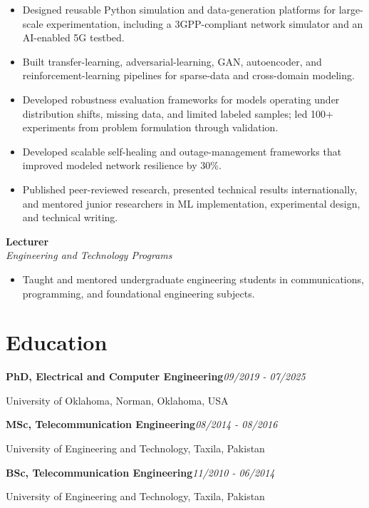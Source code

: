 \documentclass[9pt,letterpaper]{extarticle}
\newcommand{\role}[4]{%
  \Needspace{4\baselineskip}\textbf{#1}\hfill\textbf{#2}\\[-1pt]
  \textit{#3}\hfill\textit{#4}\par}
\newcommand{\entry}[2]{\Needspace{4\baselineskip}\textbf{#1}\hfill\textit{#2}\par}
\begin{document}
\begin{itemize}
\item Designed reusable Python simulation and data-generation platforms for large-scale experimentation, including a 3GPP-compliant network simulator and an AI-enabled 5G testbed.
\item Built transfer-learning, adversarial-learning, GAN, autoencoder, and reinforcement-learning pipelines for sparse-data and cross-domain modeling.
\item Developed robustness evaluation frameworks for models operating under distribution shifts, missing data, and limited labeled samples; led 100+ experiments from problem formulation through validation.
\item Developed scalable self-healing and outage-management frameworks that improved modeled network resilience by 30\%.
\item Published peer-reviewed research, presented technical results internationally, and mentored junior researchers in ML implementation, experimental design, and technical writing.
\end{itemize}
\role{Lecturer}{}{Engineering and Technology Programs}{}
\begin{itemize}
\item Taught and mentored undergraduate engineering students in communications, programming, and foundational engineering subjects.
\end{itemize}
\section{Education}
\entry{PhD, Electrical and Computer Engineering}{09/2019 - 07/2025}
University of Oklahoma, Norman, Oklahoma, USA\par
\entry{MSc, Telecommunication Engineering}{08/2014 - 08/2016}
University of Engineering and Technology, Taxila, Pakistan\par
\entry{BSc, Telecommunication Engineering}{11/2010 - 06/2014}
University of Engineering and Technology, Taxila, Pakistan\par
{}
\end{document}
